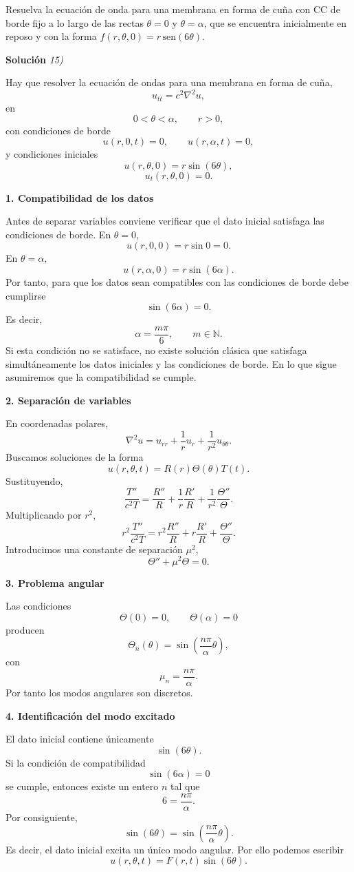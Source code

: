 \documentclass[11pt,spanish]{article}
\newcounter{problema}
\newcommand{\prob}{\stepcounter{problema} \vspace{.5cm} \noindent{\bf Problema \arabic{problema}: }}
\begin{document}
\prob Resuelva la ecuación de onda para una membrana en forma de cuña con CC de borde fijo a lo largo de las rectas \(\theta=0\) y \(\theta=\alpha\), que se encuentra inicialmente en reposo y con la forma \(f(r,\theta,0)=r\,\text{sen}(6\theta)\).

\vspace{0.5cm}
{\bf Soluci\'on }{\em 15)}
\vspace{0.5cm}

Hay que resolver la ecuación de ondas para una membrana en forma de cuña,
$$
u_{tt}=c^2\nabla^2u,
$$
en
$$
0<\theta<\alpha,\qquad r>0,
$$
con condiciones de borde
$$
u(r,0,t)=0,
\qquad
u(r,\alpha,t)=0,
$$
y condiciones iniciales
$$
u(r,\theta,0)=r\sin(6\theta),
$$
$$
u_t(r,\theta,0)=0.
$$

{\bf 1. Compatibilidad de los datos}

Antes de separar variables conviene verificar que el dato inicial satisfaga las condiciones de borde.
En $\theta=0$,
$$
u(r,0,0)=r\sin 0=0.
$$
En $\theta=\alpha$,
$$
u(r,\alpha,0)=r\sin(6\alpha).
$$
Por tanto, para que los datos sean compatibles con las condiciones de borde debe cumplirse
$$
\boxed{\sin(6\alpha)=0.}
$$
Es decir,
$$
\boxed{
\alpha=\frac{m\pi}{6},
\qquad m\in\mathbb N.
}
$$
Si esta condición no se satisface, no existe solución clásica que satisfaga simultáneamente los datos iniciales y las condiciones de borde.
En lo que sigue asumiremos que la compatibilidad se cumple.

{\bf 2. Separación de variables}

En coordenadas polares,
$$
\nabla^2u
=
u_{rr}
+\frac1r u_r
+\frac1{r^2}u_{\theta\theta}.
$$
Buscamos soluciones de la forma
$$
u(r,\theta,t)=R(r)\Theta(\theta)T(t).
$$
Sustituyendo,
$$
\frac{T''}{c^2T}
=
\frac{R''}{R}
+\frac1r\frac{R'}R
+\frac1{r^2}\frac{\Theta''}{\Theta}.
$$
Multiplicando por $r^2$,
$$
r^2\frac{T''}{c^2T}
=
r^2\frac{R''}{R}
+r\frac{R'}R
+\frac{\Theta''}{\Theta}.
$$
Introducimos una constante de separación $\mu^2$,
$$
\Theta''+\mu^2\Theta=0.
$$

{\bf 3. Problema angular}

Las condiciones
$$
\Theta(0)=0,
\qquad
\Theta(\alpha)=0
$$
producen
$$
\Theta_n(\theta)
=
\sin\left(\frac{n\pi}{\alpha}\theta\right),
$$
con
$$
\mu_n=\frac{n\pi}{\alpha}.
$$
Por tanto los modos angulares son discretos.

{\bf 4. Identificación del modo excitado}

El dato inicial contiene únicamente
$$
\sin(6\theta).
$$
Si la condición de compatibilidad
$$
\sin(6\alpha)=0
$$
se cumple, entonces existe un entero $n$ tal que
$$
6=\frac{n\pi}{\alpha}.
$$
Por consiguiente,
$$
\sin(6\theta)
=
\sin\left(\frac{n\pi}{\alpha}\theta\right).
$$
Es decir, el dato inicial excita un único modo angular.
Por ello podemos escribir
$$
u(r,\theta,t)
=
F(r,t)\sin(6\theta).
$$
\end{document}
